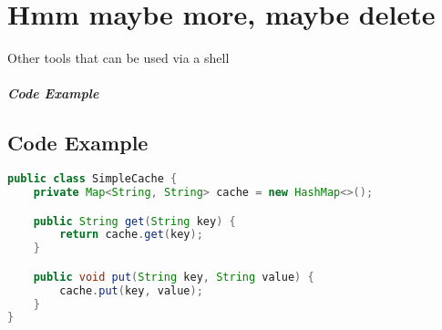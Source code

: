 \documentclass[a4paper, 11pt]{book}
\begin{document}
    \chapter{Hmm maybe more, maybe delete}
Other tools that can be used via a shell


    \paragraph{Code Example}

    \section{Code Example}
    \begin{lstlisting}[language=Java, caption=Java Code for a Simple Cache]
public class SimpleCache {
    private Map<String, String> cache = new HashMap<>();

    public String get(String key) {
        return cache.get(key);
    }

    public void put(String key, String value) {
        cache.put(key, value);
    }
}
    \end{lstlisting}
\end{document}
